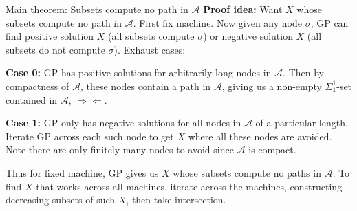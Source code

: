 \begin{frame}{Main theorem: Subsets compute no path in $\mathcal{A}$}
  \textbf{Proof idea:} Want $X$ whose subsets compute no path in 
  $\mathcal{A}$. First fix machine. Now given any node $\sigma$, GP can
  find positive solution $X$ (all subsets compute $\sigma$) or negative
  solution $X$ (all subsets do not compute $\sigma$). Exhaust cases:

  \vspace{1em}
  \textbf{Case 0:} GP has positive solutions for arbitrarily long nodes in
  $\mathcal{A}$. Then by compactness of $\mathcal{A}$, these nodes contain
  a path in $\mathcal{A}$, giving us a non-empty $\Sigma_1^1$-set contained
  in $\mathcal{A}$, $\Rightarrow\Leftarrow$.

  \vspace{0.5em}
  \textbf{Case 1:} GP only has negative solutions for all nodes in
  $\mathcal{A}$ of a particular length. Iterate GP across each such node to
  get $X$ where all these nodes are avoided. Note there are only finitely
  many nodes to avoid since $\mathcal{A}$ is compact.


  \vspace{1em}
  Thus for fixed machine, GP gives us $X$ whose subsets compute no paths in
  $\mathcal{A}$. To find $X$ that works across all machines, iterate across
  the machines, constructing decreasing subsets of such $X$, then take
  intersection.
\end{frame}

